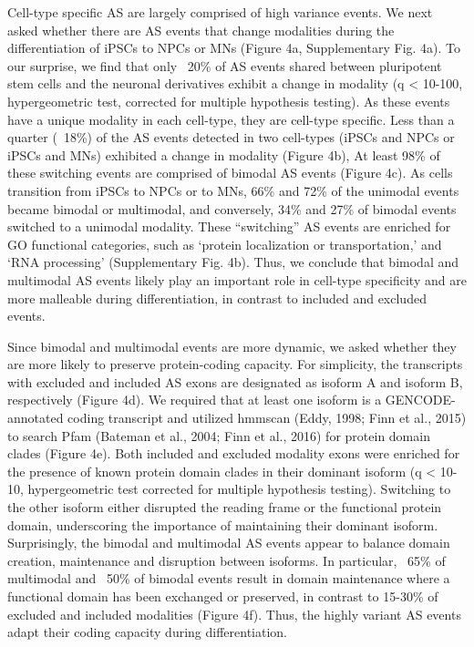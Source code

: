 Cell-type specific AS are largely comprised of high variance events.
We next asked whether there are AS events that change modalities during the differentiation of iPSCs to NPCs or MNs (Figure 4a, Supplementary Fig. 4a). To our surprise, we find that only ~20\% of AS events shared between pluripotent stem cells and the neuronal derivatives exhibit a change in modality (q < 10-100, hypergeometric test, corrected for multiple hypothesis testing). As these events have a unique modality in each cell-type, they are cell-type specific. Less than a quarter (~18\%) of the AS events detected in two cell-types (iPSCs and NPCs or iPSCs and MNs) exhibited a change in modality (Figure 4b), At least 98\% of these switching events are comprised of bimodal AS events (Figure 4c). As cells transition from iPSCs to NPCs or to MNs, 66\% and 72\% of the unimodal events became bimodal or multimodal, and conversely, 34\% and 27\% of bimodal events switched to a unimodal modality. These “switching” AS events are enriched for GO functional categories, such as ‘protein localization or transportation,' and ‘RNA processing' (Supplementary Fig. 4b). Thus, we conclude that bimodal and multimodal AS events likely play an important role in cell-type specificity and are more malleable during differentiation, in contrast to included and excluded events.

Since bimodal and multimodal events are more dynamic, we asked whether they are more likely to preserve protein-coding capacity. For simplicity, the transcripts with excluded and included AS exons are designated as isoform A and isoform B, respectively (Figure 4d). We required that at least one isoform is a GENCODE-annotated coding transcript and utilized hmmscan (Eddy, 1998; Finn et al., 2015) to search Pfam (Bateman et al., 2004; Finn et al., 2016) for protein domain clades (Figure 4e). Both included and excluded modality exons were enriched for the presence of known protein domain clades in their dominant isoform (q < 10-10, hypergeometric test corrected for multiple hypothesis testing). Switching to the other isoform either disrupted the reading frame or the functional protein domain, underscoring the importance of maintaining their dominant isoform. Surprisingly, the bimodal and multimodal AS events appear to balance domain creation, maintenance and disruption between isoforms. In particular, ~65\% of multimodal and ~50\% of bimodal events result in domain maintenance where a functional domain has been exchanged or preserved, in contrast to 15-30\% of excluded and included modalities (Figure 4f). Thus, the highly variant AS events adapt their coding capacity during differentiation.

